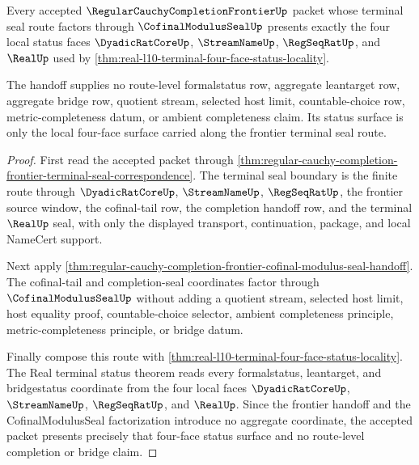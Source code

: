 \begin{theorem}
\label{thm:regular-cauchy-completion-frontier-real-four-face-status-factorization}
Every accepted $\RegularCauchyCompletionFrontierUp$ packet whose terminal seal route factors through $\CofinalModulusSealUp$ presents exactly the four local status faces $\DyadicRatCoreUp$, $\StreamNameUp$, $\RegSeqRatUp$, and $\RealUp$ used by \autoref{thm:real-l10-terminal-four-face-status-locality}.

The handoff supplies no route-level formalstatus row, aggregate leantarget row, aggregate bridge row, quotient stream, selected host limit, countable-choice row, metric-completeness datum, or ambient completeness claim. Its status surface is only the local four-face surface carried along the frontier terminal seal route.
\end{theorem}
\begin{proof}
First read the accepted packet through \autoref{thm:regular-cauchy-completion-frontier-terminal-seal-correspondence}. The terminal seal boundary is the finite route through $\DyadicRatCoreUp$, $\StreamNameUp$, $\RegSeqRatUp$, the frontier source window, the cofinal-tail row, the completion handoff row, and the terminal $\RealUp$ seal, with only the displayed transport, continuation, package, and local NameCert support.

Next apply \autoref{thm:regular-cauchy-completion-frontier-cofinal-modulus-seal-handoff}. The cofinal-tail and completion-seal coordinates factor through $\CofinalModulusSealUp$ without adding a quotient stream, selected host limit, host equality proof, countable-choice selector, ambient completeness principle, metric-completeness principle, or bridge datum.

Finally compose this route with \autoref{thm:real-l10-terminal-four-face-status-locality}. The Real terminal status theorem reads every formalstatus, leantarget, and bridgestatus coordinate from the four local faces $\DyadicRatCoreUp$, $\StreamNameUp$, $\RegSeqRatUp$, and $\RealUp$. Since the frontier handoff and the CofinalModulusSeal factorization introduce no aggregate coordinate, the accepted packet presents precisely that four-face status surface and no route-level completion or bridge claim.
\end{proof}


